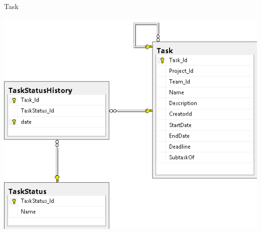 \begin{frame}{Task}
  \begin{center}
    \includegraphics[height=0.9\textheight]{images/database/Task.png}
  \end{center}
\end{frame}